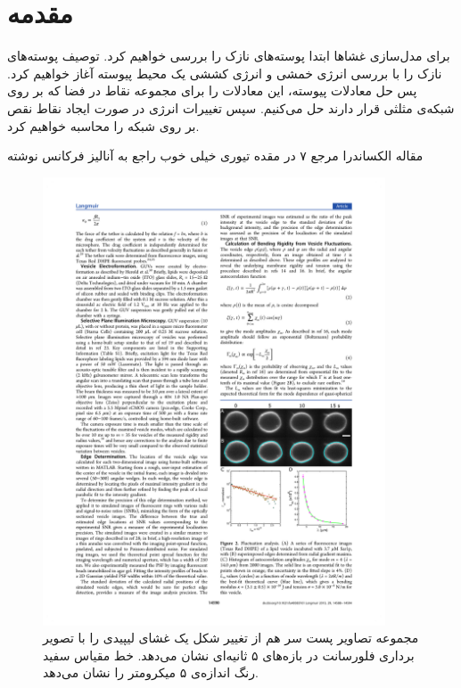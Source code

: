 \setRL
\clearpage
{} 


\section{
مقدمه
}
برای مدل‌سازی غشاها ابتدا پوسته‌های نازک را بررسی خواهیم کرد. توصیف پوسته‌های نازک را با بررسی انرژی خمشی و انرژی کششی یک محیط پیوسته آغاز خواهیم کرد. پس حل معادلات پیوسته، این معادلات را برای مجموعه نقاط در فضا که بر روی شبکه‌ی مثلثی قرار دارند حل می‌کنیم. سپس تغییرات انرژی در صورت ایجاد نقاط نقص بر روی شبکه را محاسبه خواهیم کرد. 


مقاله الکساندرا مرجع ۷ در مقده تيوری خیلی خوب راجع به آنالیز فرکانس نوشته


\begin{figure}[h]
\begin{center}
\includegraphics[width=4in]{Figs/Membrane_fluctuations}
\caption{
مجموعه تصاویر پست سر هم از تغییر شکل یک غشای لیپیدی را با تصویر برداری فلورسانت در بازه‌های ۵ ثانیه‌ای نشان می‌دهد. خط مقیاس سفید رنگ اندازه‌ی ۵ میکرومتر را نشان می‌دهد. 
\cite{ParthasarathyMembraneMeasurement}
}
\label{fig:flucmem}
\end{center}
\end{figure}

